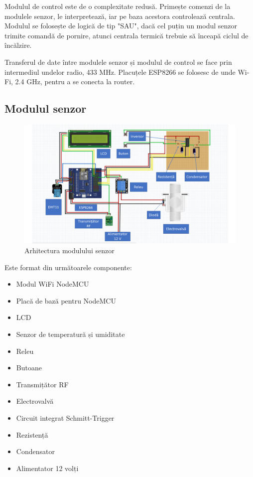 	Modulul de control este de o complexitate redusă. Primește comenzi de la modulele senzor, le interpretează, iar pe baza acestora controlează centrala. Modulul se folosește de logică de tip "SAU", dacă cel puțin un modul senzor trimite comandă de pornire, atunci centrala termică trebuie să înceapă ciclul de încălzire.

	Transferul de date între modulele senzor și modulul de control se face prin intermediul undelor radio, 433 MHz. Placuțele ESP8266 se folosesc de unde Wi-Fi, 2.4 GHz, pentru a se conecta la router.

\subsection{Modulul senzor}

\begin{figure}[H]
   	\centering
    	\includegraphics[width=1\textwidth]{ModulSenzor.png}
	\caption{Arhitectura modulului senzor}
\end{figure}	

	Este format din următoarele componente:
	\begin{itemize}
		\setlength{\itemindent}{2em}
			\itemsep0em
			\item Modul WiFi NodeMCU
			\item Placă de bază pentru NodeMCU
			\item LCD
			\item Senzor de temperatură și umiditate
			\item Releu
			\item Butoane
			\item Transmițător RF
			\item Electrovalvă
			\item Circuit integrat Schmitt-Trigger
			\item Rezistență
			\item Condensator
			\item Alimentator 12 volți
	\end{itemize}

